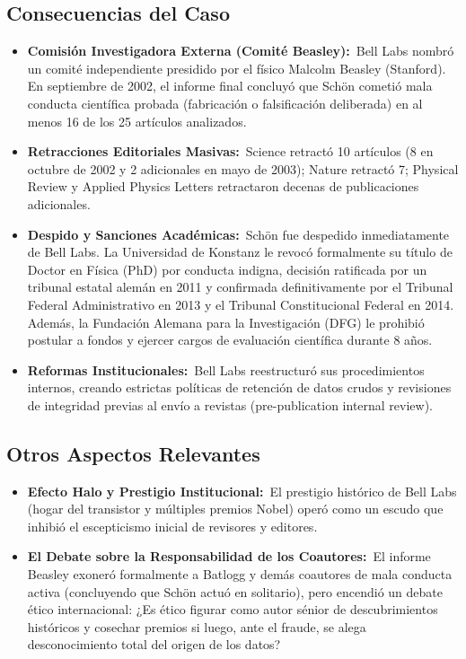\documentclass[12pt,a4paper]{article}
\newcommand{\itemlabel}[3]{\textbf{#1#2}~#3}
\begin{document}
\subsection{Consecuencias del Caso}
\begin{itemize}

\item \itemlabel{Comisión Investigadora Externa (Comité Beasley)}{:}{Bell Labs nombró un comité independiente presidido por el físico Malcolm Beasley (Stanford). En septiembre de 2002, el informe final concluyó que Schön cometió mala conducta científica probada (fabricación o falsificación deliberada) en al menos 16 de los 25 artículos analizados.}
\item \itemlabel{Retracciones Editoriales Masivas}{:}{Science retractó 10 artículos (8 en octubre de 2002 y 2 adicionales en mayo de 2003); Nature retractó 7; Physical Review y Applied Physics Letters retractaron decenas de publicaciones adicionales.}
\item \itemlabel{Despido y Sanciones Académicas}{:}{Schön fue despedido inmediatamente de Bell Labs. La Universidad de Konstanz le revocó formalmente su título de Doctor en Física (PhD) por conducta indigna, decisión ratificada por un tribunal estatal alemán en 2011 y confirmada definitivamente por el Tribunal Federal Administrativo en 2013 y el Tribunal Constitucional Federal en 2014. Además, la Fundación Alemana para la Investigación (DFG) le prohibió postular a fondos y ejercer cargos de evaluación científica durante 8 años.}
\item \itemlabel{Reformas Institucionales}{:}{Bell Labs reestructuró sus procedimientos internos, creando estrictas políticas de retención de datos crudos y revisiones de integridad previas al envío a revistas (pre-publication internal review).}
\end{itemize}
\subsection{Otros Aspectos Relevantes}
\begin{itemize}
\item \itemlabel{Efecto Halo y Prestigio Institucional}{:}{El prestigio histórico de Bell Labs (hogar del transistor y múltiples premios Nobel) operó como un escudo que inhibió el escepticismo inicial de revisores y editores.}
\item \itemlabel{El Debate sobre la Responsabilidad de los Coautores}{:}{El informe Beasley exoneró formalmente a Batlogg y demás coautores de mala conducta activa (concluyendo que Schön actuó en solitario), pero encendió un debate ético internacional: ¿Es ético figurar como autor sénior de descubrimientos históricos y cosechar premios si luego, ante el fraude, se alega desconocimiento total del origen de los datos?}
\end{itemize}
\end{document}
